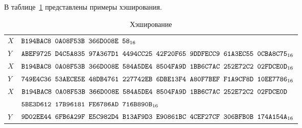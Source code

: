 \label{TEST.Hash}

В таблице~\ref{Table.TEST.Hash} представлены примеры хэширования.

\begin{table}[H]
\caption{Хэширование}\label{Table.TEST.Hash}
\begin{tabular}{|l|l|}
\hline
$X$ &
$\texttt{B194BAC8~0A08F53B~366D008E~58}_{16}$\\
\dhline
$Y$ &
$\texttt{ABEF9725~D4C5A835~97A367D1~4494CC25~42F20F65~9DDFECC9~61A3EC55~0CBA8C75}_{16}$\\
\ddhline
$X$ &
$\texttt{B194BAC8~0A08F53B~366D008E~584A5DE4~8504FA9D~1BB6C7AC~252E72C2~02FDCE0D}_{16}$\\
\dhline
$Y$ &
$\texttt{749E4C36~53AECE5E~48DB4761~227742EB~6DBE13F4~A80F7BEF~F1A9CF8D~10EE7786}_{16}$\\
\ddhline
$X$ &
$\texttt{B194BAC8~0A08F53B~366D008E~584A5DE4~8504FA9D~1BB6C7AC~252E72C2~02FDCE0D}$\\
&
$\texttt{5BE3D612~17B96181~FE6786AD~716B890B}_{16}$\\
\dhline
$Y$ &
$\texttt{9D02EE44~6FB6A29F~E5C982D4~B13AF9D3~E90861BC~4CEF27CF~306BFB0B~174A154A}_{16}$\\
\hline
\end{tabular}
\end{table}
